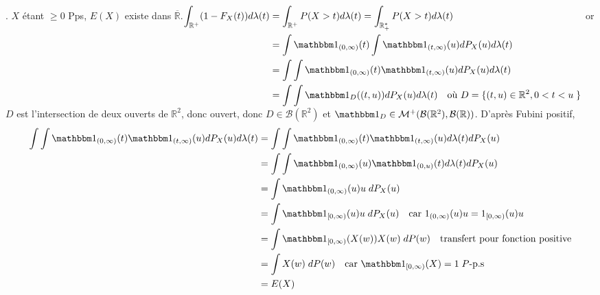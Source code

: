 \documentclass{report}
\begin{document}
\subsection{} \noindent{}\\ 
\\ 
\\
. $X$ étant $\geq 0$ Pps, $E(X)$ existe dans $\overline{\mathbb R}$.\newline  $\begin{aligned}[t]
\int_{\mathbb R^+} (1-F_X(t))d\lambda(t) &= \int_{\mathbb R^+}  P(X>t) d\lambda(t) = \int_{\mathbb R_+^*}  P(X>t) d\lambda(t) \\
&= \int \mathbbm 1_{(0,\infty)}(t) \int \mathbbm 1_{(t,\infty)}(u) dP_X(u) d\lambda(t) \\
&= \int \int \mathbbm 1_{(0,\infty)}(t)\mathbbm 1_{(t,\infty)}(u) dP_X(u) d\lambda(t) \\
&= \int \int \mathbbm 1_{D}((t,u))dP_X(u) d\lambda(t) \quad \text{où } D=\{(t,u)\in \mathbb R^2, 0<t<u\;\}
\end{aligned}$\newline
or $D$ est l'intersection de deux ouverts de $\mathbb R^2$, donc ouvert, donc $D \in \mathcal B(\mathbb R^2)$ et $\mathbbm 1_D \in \mathcal M^+(\mathcal B(\mathbb R^2),\mathcal B(\mathbb R))$. D'après Fubini positif, $$ \begin{aligned} \int \int \mathbbm 1_{(0,\infty)}(t)\mathbbm 1_{(t,\infty)}(u) dP_X(u) d\lambda(t) 
&= \int \int \mathbbm 1_{(0,\infty)}(t)\mathbbm 1_{(t,\infty)}(u) d\lambda(t) dP_X(u) \\
&= \int \int \mathbbm 1_{(0,\infty)}(u)\mathbbm 1_{(0,u)}(t)d\lambda(t) dP_X(u) \\
&= \int \mathbbm 1_{(0,\infty)}(u) u  \;dP_X(u) \\
&= \int \mathbbm 1_{[0,\infty)}(u) u \;dP_X(u)  \quad \text{car } 1_{(0,\infty)}(u) u = 1_{[0,\infty)}(u) u \\
&= \int \mathbbm 1_{[0,\infty)}(X(w)) X(w) \;dP(w) \quad \text{transfert pour fonction positive} \\
&= \int X(w) \;dP(w) \quad \text{car } \mathbbm 1_{[0,\infty)}(X) = 1 \; P\text{-p.s}\\
&= E(X)
 \end{aligned}$$
\end{document}
